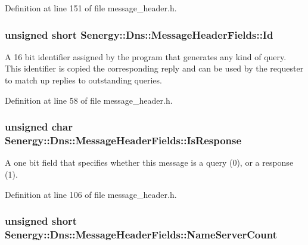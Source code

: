 Definition at line 151 of file message\-\_\-header.\-h.

\hypertarget{struct_senergy_1_1_dns_1_1_message_header_fields_ab423a1e91fecd6ad2ec36a4bdafd5c2b}{
\subsubsection[{Id}]{\setlength{\rightskip}{0pt plus 5cm}unsigned short Senergy\-::\-Dns\-::\-Message\-Header\-Fields\-::\-Id}}\label{struct_senergy_1_1_dns_1_1_message_header_fields_ab423a1e91fecd6ad2ec36a4bdafd5c2b}


A 16 bit identifier assigned by the program that generates any kind of query. This identifier is copied the corresponding reply and can be used by the requester to match up replies to outstanding queries. 



Definition at line 58 of file message\-\_\-header.\-h.

\hypertarget{struct_senergy_1_1_dns_1_1_message_header_fields_a0d0ac4fa85684c3d66a84e3392f3ef99}{
\subsubsection[{Is\-Response}]{\setlength{\rightskip}{0pt plus 5cm}unsigned char Senergy\-::\-Dns\-::\-Message\-Header\-Fields\-::\-Is\-Response}}\label{struct_senergy_1_1_dns_1_1_message_header_fields_a0d0ac4fa85684c3d66a84e3392f3ef99}


A one bit field that specifies whether this message is a query (0), or a response (1). 



Definition at line 106 of file message\-\_\-header.\-h.

\hypertarget{struct_senergy_1_1_dns_1_1_message_header_fields_a963b92841b3f7fc5fc9268c963d32d8d}{
\subsubsection[{Name\-Server\-Count}]{\setlength{\rightskip}{0pt plus 5cm}unsigned short Senergy\-::\-Dns\-::\-Message\-Header\-Fields\-::\-Name\-Server\-Count}}\label{struct_senergy_1_1_dns_1_1_message_header_fields_a963b92841b3f7fc5fc9268c963d32d8d}


